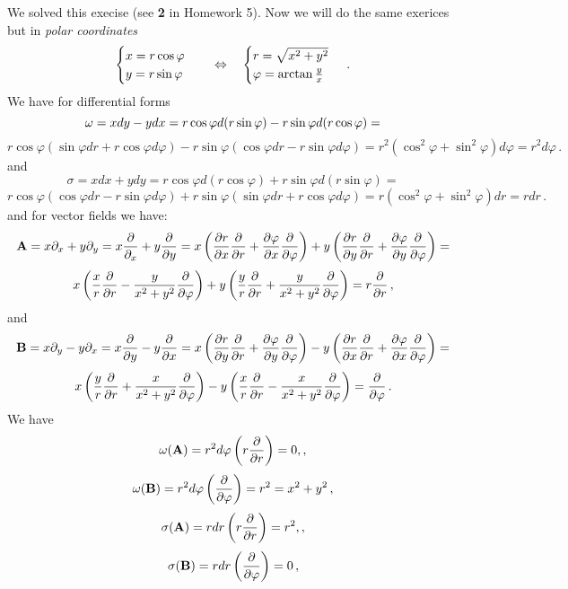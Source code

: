 \documentclass[12pt]{article}
\numberwithin{equation}{section}
\begin{document}
   We solved this execise (see {\bf 2} in Homework 5). Now we will do the
same exerices but in {\it polar coordinates}
            \begin{equation}\label{polarcoordinates}
         \begin{cases}
             x=r\cos\varphi\cr   
             y=r\sin\varphi\cr   
             \end{cases}
 \quad
   \Leftrightarrow \quad
         \begin{cases}
             r=\sqrt {x^2+y^2}\cr   
             \varphi={\rm arctan\,}{y\over x}\cr   
             \end{cases}\,.
            \end{equation}
  We have  for differential forms
             $$
{\omega}=xdy-ydx=
r\cos\varphi d(r\sin\varphi)-
r\sin\varphi d(r\cos\varphi)=
         $$
         \begin{equation}\label{form1}
r\cos\varphi(\sin\varphi dr+r\cos\varphi d\varphi)-
r\sin\varphi(\cos\varphi dr-r\sin\varphi d\varphi)=
 r^2(\cos^2\varphi+\sin^2\varphi)d\varphi=r^2d\varphi\,.
            \end{equation}
and
           $$\sigma=xdx+ydy=
r\cos\varphi d(r\cos\varphi)+
r\sin\varphi d(r\sin\varphi)=
         $$
          \begin{equation}\label{form2}
r\cos\varphi(\cos\varphi dr-r\sin\varphi d\varphi)+
r\sin\varphi(\sin\varphi dr+r\cos\varphi d\varphi)=
 r(\cos^2\varphi+\sin^2\varphi)dr=rdr\,.
           \end{equation}
and for vector fields we have:
     $$
{\bf A}=x\partial_x+y\partial_y=
x{\partial\over \partial_x}+
y{\partial\over \partial y}=
x\left(
 {\partial r\over \partial x}{\partial\over \partial r}+
  {\partial \varphi\over \partial x}{\partial\over \partial \varphi}
     \right)+y\left(
 {\partial r\over \partial y}{\partial\over \partial r}+
  {\partial \varphi\over \partial y}{\partial\over \partial \varphi}
     \right)=
             $$
          \begin{equation}\label{vectorfield1}
x\left(
 {x\over r}{\partial\over \partial r}-
  {{y\over x^2+y^2}}{\partial\over \partial \varphi}
     \right)+y\left(
 {y\over r}{\partial\over \partial r}+
  {y\over x^2+y^2}{\partial\over \partial \varphi}
     \right)=r{\partial\over \partial r}\,,
           \end{equation}
and
            $$
{\bf B}=x\partial_y-y\partial_x=
x{\partial\over \partial y}-
y{\partial\over \partial x}=
x\left(
 {\partial r\over \partial y}{\partial\over \partial r}+
  {\partial \varphi\over \partial y}{\partial\over \partial \varphi}
     \right)-y\left(
 {\partial r\over \partial x}{\partial\over \partial r}+
  {\partial \varphi\over \partial x}{\partial\over \partial \varphi}
     \right)=
             $$
          \begin{equation}\label{vectorfield2}
x\left(
 {y\over r}{\partial\over \partial r}+
  {{x\over x^2+y^2}}{\partial\over \partial \varphi}
     \right)-y\left(
 {x\over r}{\partial\over \partial r}-
  {x\over x^2+y^2}{\partial\over \partial \varphi}
     \right)={\partial\over \partial \varphi}\,.
           \end{equation}
       We have
               $$
{\omega}({\bf A})=r^2d\varphi\left(r{\partial\over \partial r}\right)=0,,
             $$
                $$
{\omega}({\bf B})=r^2d\varphi\left({\partial\over \partial \varphi}\right)=r^2=x^2+y^2\,,
             $$
                $$
\sigma({\bf A})=rdr \left(r{\partial\over \partial r}\right)=r^2,,
             $$
                $$
\sigma({\bf B})=rdr\left({\partial\over \partial \varphi}\right)=0\,,
             $$
 
\end{document}
